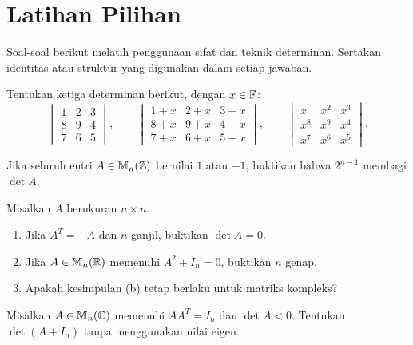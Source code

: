 \clearpage
\section{Latihan Pilihan}
\label{det:latihan}

Soal-soal berikut melatih penggunaan sifat dan teknik determinan.
Sertakan identitas atau struktur yang digunakan dalam setiap jawaban.

\begin{latihan}\label{det:lat-tigadeterminan}
      Tentukan ketiga determinan berikut, dengan $x\in\mathbb{F}$:
      \[
            \begin{vmatrix}1&2&3\\8&9&4\\7&6&5\end{vmatrix},\qquad
            \begin{vmatrix}1+x&2+x&3+x\\8+x&9+x&4+x\\7+x&6+x&5+x\end{vmatrix},
            \qquad
            \begin{vmatrix}x&x^2&x^3\\x^8&x^9&x^4\\x^7&x^6&x^5\end{vmatrix}.
      \]
\end{latihan}

\begin{latihan}\label{det:lat-divisibilitas}
      Jika seluruh entri $A\in\mathbb{M}_n(\mathbb{Z})$ bernilai $1$ atau $-1$,
      buktikan bahwa $2^{n-1}$ membagi $\det A$.
\end{latihan}

\begin{latihan}\label{det:lat-paritas}
      Misalkan $A$ berukuran $n\times n$.
      \begin{enumerate}[label=(\alph*)]
            \item Jika $A^T=-A$ dan $n$ ganjil, buktikan $\det A=0$.
            \item Jika $A\in\mathbb{M}_n(\mathbb{R})$ memenuhi $A^2+I_n=0$, buktikan $n$ genap.
            \item Apakah kesimpulan (b) tetap berlaku untuk matriks kompleks?
      \end{enumerate}
\end{latihan}

\begin{latihan}\label{det:lat-ortogonal}
      Misalkan $A\in\mathbb{M}_n(\mathbb{C})$ memenuhi $AA^T=I_n$ dan $\det A<0$.
      Tentukan $\det(A+I_n)$ tanpa menggunakan nilai eigen.
\end{latihan}

